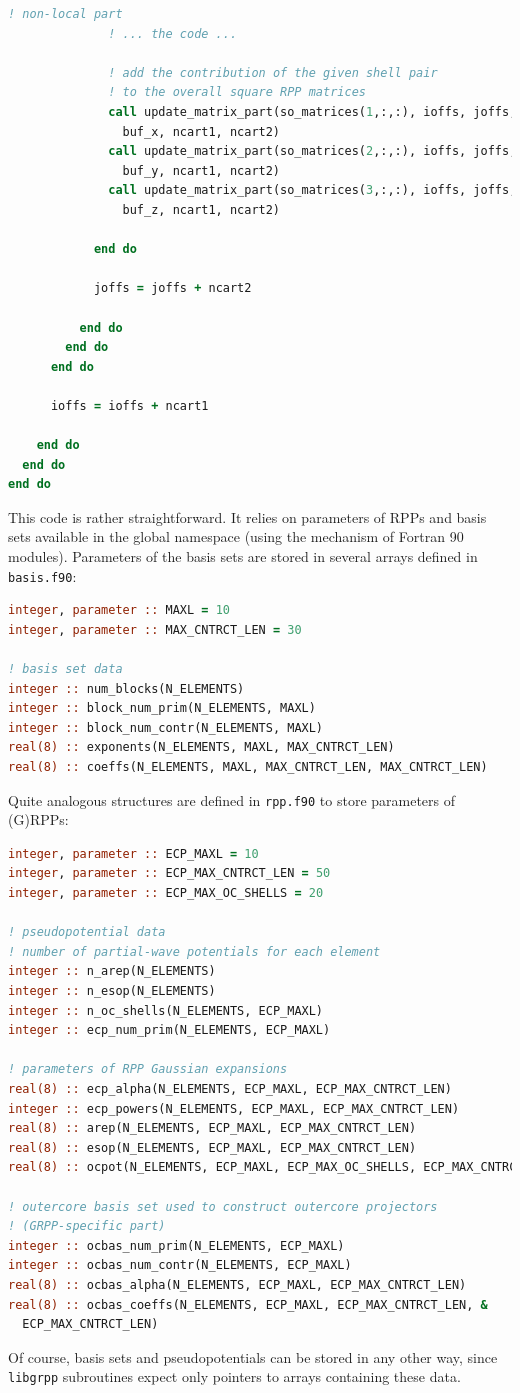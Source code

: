 \documentclass[12pt]{article}
\begin{document}
\begin{lstlisting}[language=Fortran]
              ! non-local part
              ! ... the code ...

              ! add the contribution of the given shell pair
              ! to the overall square RPP matrices
              call update_matrix_part(so_matrices(1,:,:), ioffs, joffs, &
                buf_x, ncart1, ncart2)
              call update_matrix_part(so_matrices(2,:,:), ioffs, joffs, &
                buf_y, ncart1, ncart2)
              call update_matrix_part(so_matrices(3,:,:), ioffs, joffs, &
                buf_z, ncart1, ncart2)

            end do

            joffs = joffs + ncart2

          end do
        end do
      end do

      ioffs = ioffs + ncart1
      
    end do
  end do
end do
\end{lstlisting}

This code is rather straightforward. It relies on parameters of RPPs and basis sets available in the global namespace (using the mechanism of Fortran 90 modules). Parameters of the basis sets are stored in several arrays defined in \texttt{basis.f90}:

\begin{lstlisting}[language=Fortran]
integer, parameter :: MAXL = 10
integer, parameter :: MAX_CNTRCT_LEN = 30

! basis set data
integer :: num_blocks(N_ELEMENTS)
integer :: block_num_prim(N_ELEMENTS, MAXL)
integer :: block_num_contr(N_ELEMENTS, MAXL)
real(8) :: exponents(N_ELEMENTS, MAXL, MAX_CNTRCT_LEN)
real(8) :: coeffs(N_ELEMENTS, MAXL, MAX_CNTRCT_LEN, MAX_CNTRCT_LEN)
\end{lstlisting}

Quite analogous structures are defined in \texttt{rpp.f90} to store parameters of (G)RPPs:

\begin{lstlisting}[language=Fortran]
integer, parameter :: ECP_MAXL = 10
integer, parameter :: ECP_MAX_CNTRCT_LEN = 50
integer, parameter :: ECP_MAX_OC_SHELLS = 20

! pseudopotential data
! number of partial-wave potentials for each element
integer :: n_arep(N_ELEMENTS)
integer :: n_esop(N_ELEMENTS)
integer :: n_oc_shells(N_ELEMENTS, ECP_MAXL)
integer :: ecp_num_prim(N_ELEMENTS, ECP_MAXL)

! parameters of RPP Gaussian expansions
real(8) :: ecp_alpha(N_ELEMENTS, ECP_MAXL, ECP_MAX_CNTRCT_LEN)
integer :: ecp_powers(N_ELEMENTS, ECP_MAXL, ECP_MAX_CNTRCT_LEN)
real(8) :: arep(N_ELEMENTS, ECP_MAXL, ECP_MAX_CNTRCT_LEN)
real(8) :: esop(N_ELEMENTS, ECP_MAXL, ECP_MAX_CNTRCT_LEN)
real(8) :: ocpot(N_ELEMENTS, ECP_MAXL, ECP_MAX_OC_SHELLS, ECP_MAX_CNTRCT_LEN)

! outercore basis set used to construct outercore projectors
! (GRPP-specific part)
integer :: ocbas_num_prim(N_ELEMENTS, ECP_MAXL)
integer :: ocbas_num_contr(N_ELEMENTS, ECP_MAXL)
real(8) :: ocbas_alpha(N_ELEMENTS, ECP_MAXL, ECP_MAX_CNTRCT_LEN)
real(8) :: ocbas_coeffs(N_ELEMENTS, ECP_MAXL, ECP_MAX_CNTRCT_LEN, &
  ECP_MAX_CNTRCT_LEN)
\end{lstlisting}

Of course, basis sets and pseudopotentials can be stored in any other way, since \texttt{libgrpp} subroutines expect only pointers to arrays containing these data.

{}

\end{document}
